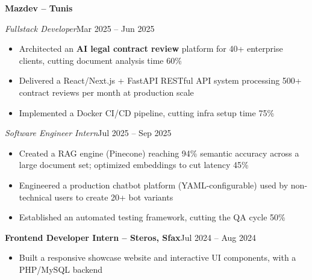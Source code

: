 \documentclass[10pt,a4paper]{article}
\newcommand{\entry}[2]{\vspace{1pt}\noindent\textbf{#1}\hfill{\color{muted}#2}\par}
\newcommand{\subentry}[2]{\noindent\textit{#1}\hfill{\color{muted}#2}\par}
\begin{document}
\entry{Mazdev -- Tunis}{}
\subentry{Fullstack Developer}{Mar 2025 -- Jun 2025}
\begin{itemize}
  \item Architected an \textbf{AI legal contract review} platform for 40+ enterprise clients, cutting document analysis time 60\%
  \item Delivered a React/Next.js + FastAPI RESTful API system processing 500+ contract reviews per month at production scale
  \item Implemented a Docker CI/CD pipeline, cutting infra setup time 75\%
\end{itemize}
\subentry{Software Engineer Intern}{Jul 2025 -- Sep 2025}
\begin{itemize}
  \item Created a RAG engine (Pinecone) reaching 94\% semantic accuracy across a large document set; optimized embeddings to cut latency 45\%
  \item Engineered a production chatbot platform (YAML-configurable) used by non-technical users to create 20+ bot variants
  \item Established an automated testing framework, cutting the QA cycle 50\%
\end{itemize}

\entry{Frontend Developer Intern -- Steros, Sfax}{Jul 2024 -- Aug 2024}
\begin{itemize}
  \item Built a responsive showcase website and interactive UI components, with a PHP/MySQL backend
\end{itemize}
\end{document}
